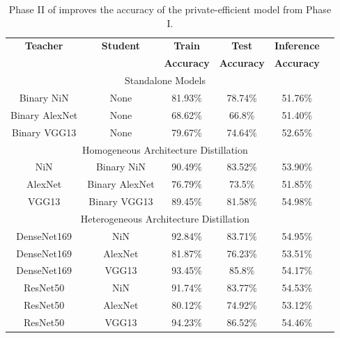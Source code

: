 \begin{table}[!htb]
\begin{center}
\renewcommand\arraystretch{1.5}
\fontsize{6.5pt}{6.5pt}\selectfont
\begin{tabular}{|c|c|c|c|c|c|}
\hline
\textbf{Teacher} & \textbf{Student} & \textbf{Train}  & \textbf{Test}  & \textbf{Inference}  \\
&  & \textbf{Accuracy} & \textbf{Accuracy} & \textbf{Accuracy}  \\
\hline
\multicolumn{5}{|c|}{Standalone Models}\\
\hline
Binary NiN & None & 81.93\% & 78.74\% & 51.76\% \\
Binary AlexNet & None & 68.62\% & 66.8\% & 51.40\% \\
Binary VGG13 & None & 79.67\% & 74.64\% & 52.65\%\\
\hline
\multicolumn{5}{|c|}{Homogeneous Architecture Distillation}\\
\hline
NiN & Binary NiN & 90.49\% & 83.52\% & 53.90\% \\
AlexNet & Binary AlexNet & 76.79\% & 73.5\% & 51.85\% \\
VGG13 & Binary VGG13 & 89.45\% & 81.58\% & 54.98\%\\
\hline
\multicolumn{5}{|c|}{Heterogeneous Architecture Distillation}\\
\hline
DenseNet169 & NiN & 92.84\% & 83.71\% & 54.95\%\\
DenseNet169 & AlexNet & 81.87\% & 76.23\% & 53.51\%\\
DenseNet169 & VGG13 & 93.45\% & 85.8\% & 54.17\%\\
\hline
ResNet50 & NiN & 91.74\% & 83.77\% & 54.53\% \\
ResNet50 & AlexNet & 80.12\% & 74.92\% & 53.12\%\\
ResNet50 & VGG13 & 94.23\% & 86.52\% & 54.46\%\\
\hline
\end{tabular}
\end{center}
\caption{Phase II of \method\hspace{0.02in} improves the accuracy of the private-efficient model from Phase I.}
\label{kd}
\vspace{-0.2in}
\end{table}


